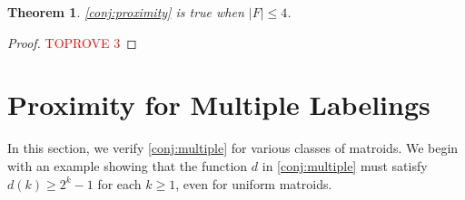 \documentclass{article}
\newtheorem{theorem}{Theorem}[section]
\theoremstyle{definition}
\begin{document}
\begin{theorem} \label{thm:four-forbidden}
\cref{conj:proximity} is true when $|F| \le 4$.
\end{theorem}
\begin{proof}\textcolor{red}{TOPROVE 3}\end{proof}

\section{Proximity for Multiple Labelings}\label{sec:multiple-label}

In this section, we verify \cref{conj:multiple} for various classes of matroids.
We begin with an example showing that the function $d$ in \cref{conj:multiple} must satisfy $d(k) \ge 2^k-1$ for each $k\ge 1$, even for uniform matroids.
\end{document}
